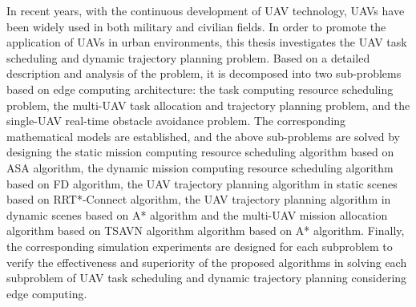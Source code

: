 \begin{abstracten}

In recent years, with the continuous development of UAV technology, UAVs have been widely used in both military and civilian fields. In order to promote the application of UAVs in urban environments, this thesis investigates the UAV task scheduling and dynamic trajectory planning problem. Based on a detailed description and analysis of the problem, it is decomposed into two sub-problems based on edge computing architecture: the task computing resource scheduling problem, the multi-UAV task allocation and trajectory planning problem, and the single-UAV real-time obstacle avoidance problem. The corresponding mathematical models are established, and the above sub-problems are solved by designing the static mission computing resource scheduling algorithm based on ASA algorithm, the dynamic mission computing resource scheduling algorithm based on FD algorithm, the UAV trajectory planning algorithm in static scenes based on RRT*-Connect algorithm, the UAV trajectory planning algorithm in dynamic scenes based on A* algorithm and the multi-UAV mission allocation algorithm based on TSAVN algorithm algorithm based on A* algorithm. Finally, the corresponding simulation experiments are designed for each subproblem to verify the effectiveness and superiority of the proposed algorithms in solving each subproblem of UAV task scheduling and dynamic trajectory planning considering edge computing.


\end{abstracten}
